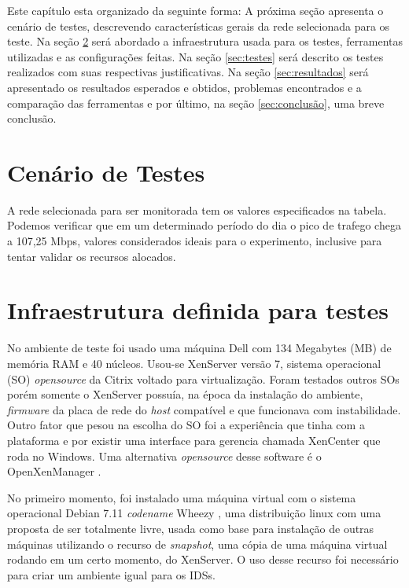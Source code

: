 \documentclass[
	12pt,				
	openright,		
	twoside,	
	a4paper,
	english,	
	brazil	
	]{abntex2}
\begin{document}
Este capítulo esta organizado da seguinte forma: A próxima seção apresenta o cenário de testes, descrevendo características gerais da rede selecionada para os teste. Na seção \ref{sec:infraestrutura} será abordado a infraestrutura usada para os testes, ferramentas utilizadas e as configurações feitas. Na seção \ref{sec:testes} será descrito os testes realizados com suas respectivas justificativas. Na seção \ref{sec:resultados} será apresentado os resultados esperados e obtidos, problemas encontrados e a comparação das ferramentas e por último, na seção \ref{sec:conclusão}, uma breve conclusão.

\section{Cenário de Testes} \label{sec:cenário}

A rede selecionada para ser monitorada tem os valores especificados na tabela. Podemos verificar que em um determinado período do dia o pico de trafego chega a 107,25 Mbps, valores considerados ideais para o experimento, inclusive para tentar validar os recursos alocados.

\section{Infraestrutura definida para testes} \label{sec:infraestrutura}

No ambiente de teste foi usado uma máquina Dell com 134 Megabytes (MB) de memória RAM e 40 núcleos. Usou-se XenServer \cite{xenserver} versão 7, sistema operacional (SO) \textit{opensource} da Citrix voltado para virtualização. Foram testados outros SOs porém somente o XenServer possuía, na época da instalação do ambiente, \textit{firmware} da placa de rede do \textit{host} compatível e que funcionava com instabilidade. Outro fator que pesou na escolha do SO foi a experiência que tinha com a plataforma e por existir uma interface para gerencia chamada XenCenter que roda no Windows. Uma alternativa \textit{opensource} desse software é o OpenXenManager \cite{openxenmanager}.

No primeiro momento, foi instalado uma máquina virtual com o sistema operacional Debian 7.11 \textit{codename} Wheezy \cite{debianwheezy}, uma distribuição linux com uma proposta de ser totalmente livre, usada como base para instalação de outras máquinas utilizando o recurso de \textit{snapshot}, uma cópia de uma máquina virtual rodando em um certo momento, do XenServer. O uso desse recurso foi necessário para criar um ambiente igual para os IDSs.
\end{document}
